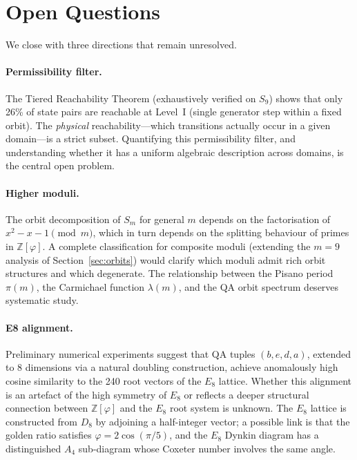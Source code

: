 \documentclass[11pt]{article}
\newcommand{\Zphi}{\mathbb{Z}[\varphi]}
\begin{document}
\section{Open Questions}\label{sec:open}

We close with three directions that remain unresolved.

\paragraph{Permissibility filter.}
The Tiered Reachability Theorem (exhaustively verified on $S_9$) shows that only 26\% of state pairs are reachable at Level~I (single generator step within a fixed orbit).  The \emph{physical} reachability---which transitions actually occur in a given domain---is a strict subset.  Quantifying this permissibility filter, and understanding whether it has a uniform algebraic description across domains, is the central open problem.

\paragraph{Higher moduli.}
The orbit decomposition of $S_m$ for general $m$ depends on the factorisation of $x^2 - x - 1 \pmod{m}$, which in turn depends on the splitting behaviour of primes in $\Zphi$.  A complete classification for composite moduli (extending the $m=9$ analysis of Section~\ref{sec:orbits}) would clarify which moduli admit rich orbit structures and which degenerate.  The relationship between the Pisano period $\pi(m)$, the Carmichael function $\lambda(m)$, and the QA orbit spectrum deserves systematic study.

\paragraph{E8 alignment.}
Preliminary numerical experiments suggest that QA tuples $(b,e,d,a)$, extended to 8 dimensions via a natural doubling construction, achieve anomalously high cosine similarity to the 240 root vectors of the $E_8$ lattice.  Whether this alignment is an artefact of the high symmetry of $E_8$ or reflects a deeper structural connection between $\Zphi$ and the $E_8$ root system is unknown.  The $E_8$ lattice is constructed from $D_8$ by adjoining a half-integer vector; a possible link is that the golden ratio satisfies $\varphi = 2\cos(\pi/5)$, and the $E_8$ Dynkin diagram has a distinguished $A_4$ sub-diagram whose Coxeter number involves the same angle.
\end{document}
